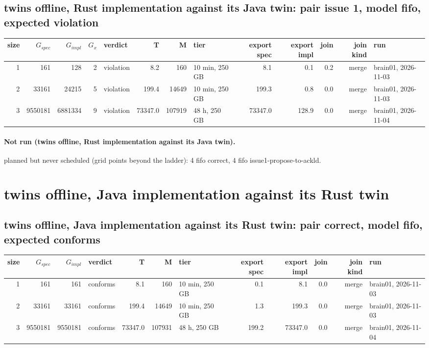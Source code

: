 \documentclass[10pt]{article}
\begin{document}
\subsection*{twins offline, Rust implementation against its Java twin: pair \textsf{issue 1}, model fifo, expected violation}
\begin{longtable}{@{}rrrrlrrlrrrrl@{}}
\toprule
size & $G_{\mathit{spec}}$ & $G_{\mathit{impl}}$ & $G_x$ & verdict & T & M & tier & export spec & export impl & join & join kind & run \\
\midrule
\endhead
\color{blue} 1 & 161 & 128 & 2 & violation & 8.2 & 160 & 10 min, 250 GB & 8.1 & 0.1 & 0.2 & merge & brain01, 2026-11-03 \\
\color{blue} 2 & 33161 & 24215 & 5 & violation & 199.4 & 14649 & 10 min, 250 GB & 199.3 & 0.8 & 0.0 & merge & brain01, 2026-11-03 \\
\color{blue} 3 & 9550181 & 6881334 & 9 & violation & 73347.0 & 107919 & 48 h, 250 GB & 73347.0 & 128.9 & 0.0 & merge & brain01, 2026-11-04 \\
\bottomrule
\end{longtable}
\paragraph{Not run (twins offline, Rust implementation against its Java twin).}
planned but never scheduled (grid points beyond the ladder): 4 fifo correct, 4 fifo issue1-propose-to-ackld.\par
\section*{twins offline, Java implementation against its Rust twin}
\subsection*{twins offline, Java implementation against its Rust twin: pair \textsf{correct}, model fifo, expected conforms}
\begin{longtable}{@{}rrrlrrlrrrrl@{}}
\toprule
size & $G_{\mathit{spec}}$ & $G_{\mathit{impl}}$ & verdict & T & M & tier & export spec & export impl & join & join kind & run \\
\midrule
\endhead
\color{blue} 1 & 161 & 161 & conforms & 8.1 & 160 & 10 min, 250 GB & 0.1 & 8.1 & 0.0 & merge & brain01, 2026-11-03 \\
\color{blue} 2 & 33161 & 33161 & conforms & 199.4 & 14649 & 10 min, 250 GB & 1.3 & 199.3 & 0.0 & merge & brain01, 2026-11-03 \\
\color{blue} 3 & 9550181 & 9550181 & conforms & 73347.0 & 107931 & 48 h, 250 GB & 199.2 & 73347.0 & 0.0 & merge & brain01, 2026-11-04 \\
\bottomrule
\end{longtable}
\end{document}
